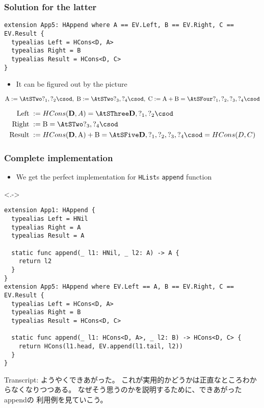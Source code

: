 \begin{frame}[fragile]
  \frametitle{Solution for the latter}

\begin{lstlisting}[style=swift]
extension App5: HAppend where A == EV.Left, B == EV.Right, C == EV.Result {
  typealias Left = HCons<D, A>
  typealias Right = B
  typealias Result = HCons<D, C>
}
\end{lstlisting}

  \begin{itemize}
    \item It can be figured out by the picture
  \end{itemize}

  \pause
  \[
    \text{A} := \STwo{?_1, ?_2},\; \text{B} := \STwo{?_3, ?_4},\; \text{C} := \text{A} + \text{B} = \SFour{?_1, ?_2, ?_3, ?_4}
  \]

  \pause
  \begin{align*}
    \text{Left}\; &:= HCons(\mathbf{D}, A) = \SThree{\mathbf{D}, ?_1, ?_2} \\
    \text{Right}\; &:= \text{B} = \STwo{?_3, ?_4} \\
    \text{Result}\; &:= HCons(\mathbf{D}, \text{A}) + \text{B} = \SFive{\mathbf{D}, ?_1, ?_2, ?_3, ?_4} = HCons(D, C)
  \end{align*}
\end{frame}

\begin{frame}[fragile]
  \frametitle{Complete implementation}

  \begin{itemize}
    \item<+-> We get the perfect implementation for \lstinline|HList|s \lstinline|append| function
  \end{itemize}

  \begin{uncoverenv}<.->
\begin{lstlisting}[style=swift]
extension App1: HAppend {
  typealias Left = HNil
  typealias Right = A
  typealias Result = A
   
  static func append(_ l1: HNil, _ l2: A) -> A {
    return l2
  }
}
extension App5: HAppend where EV.Left == A, B == EV.Right, C == EV.Result {
  typealias Left = HCons<D, A>
  typealias Right = B
  typealias Result = HCons<D, C>
   
  static func append(_ l1: HCons<D, A>, _ l2: B) -> HCons<D, C> {
    return HCons(l1.head, EV.append(l1.tail, l2))
  }
}
\end{lstlisting}
  \end{uncoverenv}

  \begin{notes}
    \item Transcript:
    ようやくできあがった。
    これが実用的かどうかは正直なところわからなくなりつつある。
    なぜそう思うのかを説明するために、できあがったappendの
    利用例を見ていこう。
  \end{notes}
\end{frame}

